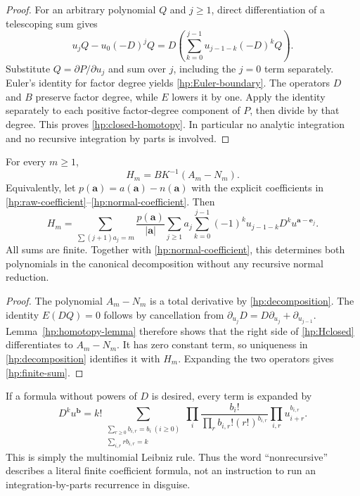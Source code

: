 \begin{proof}
For an arbitrary polynomial $Q$ and $j\ge1$, direct differentiation
of a telescoping sum gives
\[
 u_jQ-u_0(-D)^jQ
 =D\left(\sum_{k=0}^{j-1}u_{j-1-k}(-D)^kQ\right).
\]
Substitute $Q=\partial P/\partial u_j$ and sum over $j$, including
the $j=0$ term separately. Euler's identity for factor degree yields
\eqref{hp:Euler-boundary}. The operators $D$ and $B$ preserve factor
degree, while $E$ lowers it by one. Apply the identity separately
to each positive factor-degree component of $P$, then divide by that
degree. This proves \eqref{hp:closed-homotopy}. In particular no
analytic integration and no recursive integration by parts is involved.
\end{proof}

\begin{theorem}\label{hp:closed}
For every $m\ge1$,
\begin{equation}\label{hp:Hclosed}
 \boxed{\displaystyle H_m=BK^{-1}(A_m-N_m).}
\end{equation}
Equivalently, let $p(\boldsymbol a)=a(\boldsymbol a)-n(\boldsymbol a)$
with the explicit coefficients in
\eqref{hp:raw-coefficient}--\eqref{hp:normal-coefficient}. Then
\begin{equation}\label{hp:finite-sum}
 \boxed{\displaystyle
 H_m=\sum_{\sum(j+1)a_j=m}\frac{p(\boldsymbol a)}{|\boldsymbol a|}
       \sum_{j\ge1}a_j\sum_{k=0}^{j-1}(-1)^k
                  u_{j-1-k}D^k u^{\boldsymbol a-\boldsymbol e_j}.}
\end{equation}
All sums are finite. Together with \eqref{hp:normal-coefficient},
this determines both polynomials in the canonical decomposition
without any recursive normal reduction.
\end{theorem}

\begin{proof}
The polynomial $A_m-N_m$ is a total derivative by
\eqref{hp:decomposition}. The identity $E(DQ)=0$ follows by cancellation
from
$\partial_{u_j}D=D\partial_{u_j}+\partial_{u_{j-1}}$.
Lemma~\ref{hp:homotopy-lemma} therefore shows that the right side of
\eqref{hp:Hclosed} differentiates to $A_m-N_m$.
It has zero constant term, so uniqueness in
\eqref{hp:decomposition} identifies it with $H_m$.
Expanding the two operators gives \eqref{hp:finite-sum}.
\end{proof}

If a formula without powers of $D$ is desired, every term is expanded by
\begin{equation}\label{hp:Dexpansion}
 D^k u^{\boldsymbol b}
 =k!\sum_{\substack{\sum_{r\ge0}b_{i,r}=b_i\ (i\ge0)\\
                         \sum_{i,r}r b_{i,r}=k}}
       \prod_i\frac{b_i!}{\prod_r b_{i,r}!(r!)^{b_{i,r}}}
       \prod_{i,r}u_{i+r}^{b_{i,r}}.
\end{equation}
This is simply the multinomial Leibniz rule. Thus the word
``nonrecursive'' describes a literal finite coefficient formula,
not an instruction to run an integration-by-parts recurrence in disguise.

